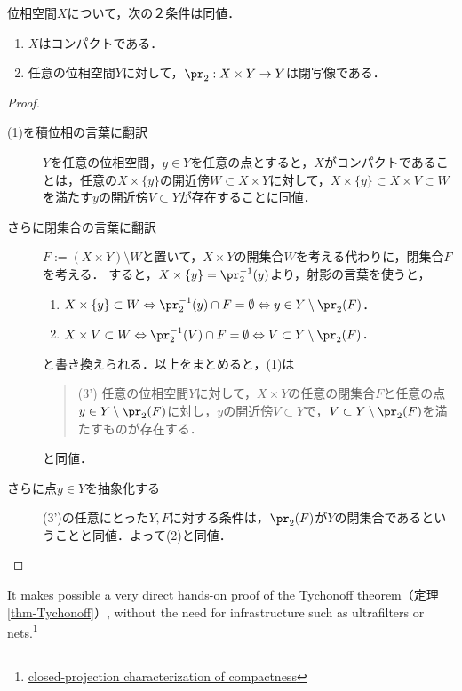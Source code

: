\documentclass[uplatex,dvipdfmx]{jsreport}
\begin{document}
\begin{proposition}[コンパクト性の射影の言葉による特徴付け]\label{prop-characterization-of-compactness-in-terms-of-projection}
    位相空間$X$について，次の２条件は同値．
    \begin{enumerate}
        \item $X$はコンパクトである．
        \item 任意の位相空間$Y$に対して，$\pr_2:X\times Y\to Y$は閉写像である．
    \end{enumerate}
\end{proposition}
\begin{proof}\mbox{}
    \begin{description}
        \item[(1)を積位相の言葉に翻訳] 
        $Y$を任意の位相空間，$y\in Y$を任意の点とすると，$X$がコンパクトであることは，任意の$X\times\{y\}$の開近傍$W\subset X\times Y$に対して，$X\times\{y\}\subset X\times V\subset W$を満たす$y$の開近傍$V\subset Y$が存在することに同値．
        \item[さらに閉集合の言葉に翻訳]
        $F:=(X\times Y)\setminus W$と置いて，$X\times Y$の開集合$W$を考える代わりに，閉集合$F$を考える．
        すると，$X\times\{y\}=\pr_2^{-1}(y)$より，射影の言葉を使うと，
        \begin{enumerate}
            \item $X\times\{y\}\subset W\Leftrightarrow\pr_2^{-1}(y)\cap F=\emptyset\Leftrightarrow y\in Y\setminus\pr_2(F)$．
            \item $X\times V\subset W\Leftrightarrow\pr_2^{-1}(V)\cap F=\emptyset\Leftrightarrow V\subset Y\setminus\pr_2(F)$．
        \end{enumerate}
        と書き換えられる．以上をまとめると，(1)は
        \begin{quote}
            (3') 任意の位相空間$Y$に対して，$X\times Y$の任意の閉集合$F$と任意の点$y\in Y\setminus\pr_2(F)$に対し，$y$の開近傍$V\subset Y$で，$V\subset Y\setminus\pr_2(F)$を満たすものが存在する．
        \end{quote}
        と同値．
        \item[さらに点$y\in Y$を抽象化する]
        (3')の任意にとった$Y,F$に対する条件は，$\pr_2(F)$が$Y$の閉集合であるということと同値．よって(2)と同値．
    \end{description}
\end{proof}
\begin{remark}
    It makes possible a very direct hands-on proof of the Tychonoff theorem（定理\ref{thm-Tychonoff}）, without the need for infrastructure such as ultrafilters or nets.\footnote{\href{https://ncatlab.org/nlab/show/closed-projection+characterization+of+compactness}{closed-projection characterization of compactness}}
\end{remark}
\end{document}
